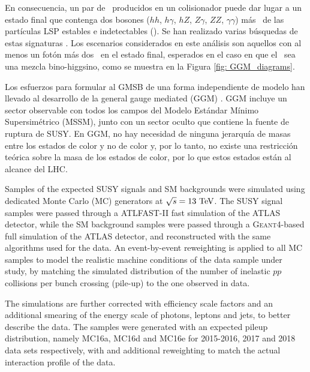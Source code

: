 En consecuencia, un par de \ninoone\  producidos en un colisionador puede dar lugar a un estado final que contenga dos bosones ($hh$, $h\gamma$, $hZ$, $Z\gamma$, $ZZ$, $\gamma\gamma$) más \met\ de las partículas LSP estables e indetectables (\gravino). Se han realizado varias búsquedas de estas signaturas \cite{SUSY-2011-12, SUSY-2012-12, EXOT-2010-06, SUSY-2011-04, ATLAS-CONF-2012-144, CMS-SUS-10-002 , CMS-SUS-11-002, CMS-SUS-14-009, SUSY-2014-01, CMS-SUS-14-004, SUSY-2014-08}.
Los escenarios considerados en este análisis son aquellos con al menos un fotón
más dos \gravino\ en el estado final, esperados en el caso en que el \ninoone\ sea una mezcla bino-higgsino, como se muestra en la Figura \ref{fig: GGM_diagrams}.

Los esfuerzos para formular al GMSB de una forma independiente de modelo han llevado al desarrollo de la general gauge mediated (GGM) \cite{Cheung: 2007es, Meade: 2008wd}. GGM incluye un sector observable con todos los campos del Modelo Estándar Mínimo Supersimétrico (MSSM), junto con un sector oculto que contiene la fuente de ruptura de SUSY.
En GGM, no hay necesidad de ninguna jerarquía de masas entre los estados de color y no de color y, por lo tanto, no existe una restricción teórica sobre la masa de los estados de color, por lo que estos estados están al alcance del LHC. 

Samples of the expected SUSY signals and SM backgrounds were simulated
using dedicated Monte Carlo (MC) generators at $\sqrt{s} = 13\ \text{TeV}$.
The SUSY signal samples were passed through a \textsc{ATLFAST-II} fast simulation \cite{Richter-Was:683751} of the ATLAS detector, while the SM background samples were passed through a \textsc{Geant4}-based full simulation \cite{Agostinelli:2002hh} of the ATLAS detector, and reconstructed with the same
algorithms used for the data. An event-by-event reweighting is applied
to all MC samples to model the realistic machine conditions of the data sample under study,
by matching the simulated distribution of the number of inelastic $pp$
collisions per bunch crossing (pile-up) to the one observed in data.

The simulations are further corrected with efficiency scale factors
and an additional smearing of the energy scale of photons, leptons and
jets, to better describe the data. The samples were generated with an
expected pileup distribution, namely MC16a, MC16d  and MC16e for 2015-2016, 2017 and
2018 data sets respectively, with and additional reweighting to match
the actual interaction profile of the data.


